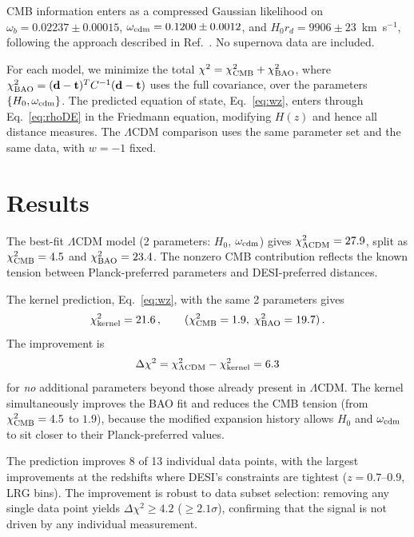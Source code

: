 \documentclass[aps,prl,twocolumn,showpacs,preprintnumbers,amsmath,amssymb,superscriptaddress]{revtex4-2}
\begin{document}
CMB information enters as a compressed Gaussian likelihood on 
$\omega_b = 0.02237 \pm 0.00015$, 
$\omega_{\rm cdm} = 0.1200 \pm 0.0012$, and 
$H_0 r_d = 9906 \pm 23$~km~s$^{-1}$, following the approach 
described in Ref.~\cite{DESI_DR2}. No supernova data are included.

For each model, we minimize the total 
$\chi^2 = \chi^2_{\rm CMB} + \chi^2_{\rm BAO}$, where 
$\chi^2_{\rm BAO} = (\mathbf{d}-\mathbf{t})^T C^{-1}(\mathbf{d}-\mathbf{t})$ 
uses the full covariance, over the parameters $\{H_0, \omega_{\rm cdm}\}$. 
The predicted equation of state, Eq.~\eqref{eq:wz}, enters through 
Eq.~\eqref{eq:rhoDE} in the Friedmann equation, modifying $H(z)$ and 
hence all distance measures. The $\Lambda$CDM comparison uses the same 
parameter set and the same data, with $w=-1$ fixed.

\section{Results}

The best-fit $\Lambda$CDM model (2 parameters: $H_0$, $\omega_{\rm cdm}$) 
gives $\chi^2_{\Lambda\rm CDM} = 27.9$, split as 
$\chi^2_{\rm CMB} = 4.5$ and $\chi^2_{\rm BAO} = 23.4$. The nonzero 
CMB contribution reflects the known tension between Planck-preferred 
parameters and DESI-preferred distances.

The kernel prediction, Eq.~\eqref{eq:wz}, with the same 2 parameters 
gives
\begin{equation}
\chi^2_{\rm kernel} = 21.6\,,\qquad 
(\chi^2_{\rm CMB} = 1.9,\;\chi^2_{\rm BAO} = 19.7)\,.
\label{eq:chi2}
\end{equation}
The improvement is
\begin{equation}
\Delta\chi^2 = \chi^2_{\Lambda\rm CDM} - \chi^2_{\rm kernel} = 6.3
\label{eq:dchi2}
\end{equation}
for \emph{no} additional parameters beyond those already present 
in $\Lambda$CDM. The kernel simultaneously 
improves the BAO fit and reduces the CMB tension (from 
$\chi^2_{\rm CMB} = 4.5$ to $1.9$), because the modified expansion 
history allows $H_0$ and $\omega_{\rm cdm}$ to sit closer to their 
Planck-preferred values.

The prediction improves 8 of 13 individual data points, with the 
largest improvements at the redshifts where DESI's constraints are 
tightest ($z = 0.7$--$0.9$, LRG bins). The improvement is robust to 
data subset selection: removing any single data point yields 
$\Delta\chi^2 \geq 4.2$ ($\geq 2.1\sigma$), confirming that the 
signal is not driven by any individual measurement.
\end{document}
